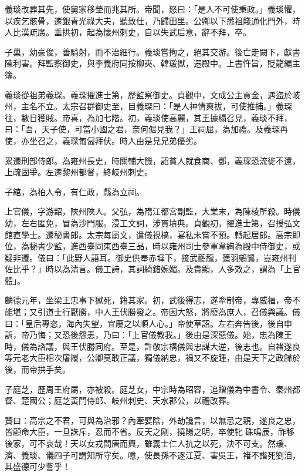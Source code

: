 \begin{pinyinscope}
 義琰改葬其先，使舅家移塋而兆其所。帝聞，怒曰：「是人不可使秉政。」義琰懼，以疾乞骸骨，遷銀青光祿大夫，聽致仕，乃歸田里。公卿以下悉祖餞通化門外，時人比漢疏廣。垂拱初，起為懷州刺史，自以失武后意，辭不拜，卒。



 子巢，幼豪俊，善騎射，而不治細行。義琰嘗拘之，絕其交游。後亡走闕下，獻書陳利害。拜監察御史，與李義府同按柳奭、韓瑗獄，遷殿中。上書忤旨，貶龍編主簿。



 義琰從祖弟義琛。義琛擢進士第，歷監察御史。貞觀中，文成公主貢金，遇盜於岐州，主名不立。太宗召群御史至，目義琛曰：「是人神情爽拔，可使推捕。」義琛往，數日獲賊。帝喜，為加七階。初，義琰使高麗，其王據榻召見，義琰不拜，曰：「吾，天子使，可當小國之君，奈何倨見我？」王祠屈，為加禮。及義琛再使，亦坐召之，義琛匍匐拜伏。時人由是見兄弟優劣。



 累遷刑部侍郎。為雍州長史，時關輔大饑，詔貧人就食商、鄧，義琛恐流徙不還，上疏固爭。左遷黎州都督，終岐州刺史。



 子綰，為柏人令，有仁政，縣為立祠。



 上官儀，字游韶，陜州陜人。父弘，為隋江都宮副監，大業末，為陳棱所殺。時儀幼，左右匿免，冒為沙門服。浸工文詞，涉貫墳典。貞觀初，擢進士第，召授弘文館直學士。遷秘書郎。太宗每屬文，遣儀視槁，宴私未嘗不預。轉起居郎。高宗即位，為秘書少監，進西臺同東西臺三品，時以雍州司士參軍韋絢為殿中侍御史，或疑非遷。儀曰：「此野人語耳。御史供奉赤墀下，接武夔龍，簉羽鵷鷺，豈雍州判佐比乎？」時以為清言。儀工詩，其詞綺錯婉媚。及貴顯，人多效之，謂為「上官體」。



 麟德元年，坐梁王忠事下獄死，籍其家。初，武後得志，遂牽制帝，專威福，帝不能堪；又引道士行厭勝，中人王伏勝發之。帝因大怒，將廢為庶人，召儀與議。儀曰：「皇后專恣，海內失望，宜廢之以順人心。」帝使草詔。左右奔告後，後自申訴，帝乃悔；又恐後怨恚，乃曰：「上官儀教我。」後由是深惡儀。始，忠為陳王時，儀為諮議，與王伏勝同府。至是，許敬宗構儀與忠謀大逆，後志也。自褚遂良等元老大臣相次屠履，公卿莫敢正議，獨儀納忠，禍又不旋踵，由是天下之政歸於後，而帝拱手矣。



 子庭芝，歷周王府屬，亦被殺。庭芝女，中宗時為昭容，追贈儀為中書令、秦州都督、楚國公；庭芝黃門侍郎、岐州刺史、天水郡公，以禮改葬。



 贊曰：高宗之不君，可與為治邪？內牽嬖陰，外劫讒言，以無忌之親，遂良之忠，皆顧命大臣，一旦誅斥，忍而不省。反天之剛，撓陽之明，卒使牝硃鳴辰，祚移後家，可不哀哉！天以女戎間唐而興，雖義士仁人抗之以死，決不可支。然瑗、濟、義琰、儀四子可謂知所守矣。噫，使長孫不逐江夏、害吳王，褚不譖死劉洎，其盛德可少訾乎！



\end{pinyinscope}